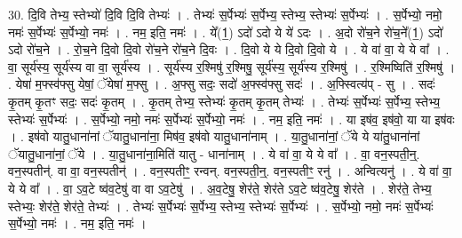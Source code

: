 \documentclass[17pt]{extarticle}
\begin{document}
30. दि॒वि तेभ्य॒ स्तेभ्यो॑ दि॒वि दि॒वि तेभ्यः॑ । . तेभ्यः॑ स॒र्पेभ्यः॑ स॒र्पेभ्य॒ स्तेभ्य॒ स्तेभ्यः॑ स॒र्पेभ्यः॑ । . स॒र्पेभ्यो॒ नमो॒ नमः॑ स॒र्पेभ्यः॑ स॒र्पेभ्यो॒ नमः॑ । . नम॒ इति॒ नमः॑ । . ये᳚(1॒) ऽदो॑ ऽदो ये ये॑ ऽदः । . अ॒दो रो॑च॒ने रो॑च॒ने᳚(1॒) ऽदो॑ ऽदो रो॑च॒ने । . रो॒च॒ने दि॒वो दि॒वो रो॑च॒ने रो॑च॒ने दि॒वः । . दि॒वो ये ये दि॒वो दि॒वो ये । . ये वा॑ वा॒ ये ये वा᳚ । . वा॒ सूर्य॑स्य॒ सूर्य॑स्य वा वा॒ सूर्य॑स्य । . सूर्य॑स्य र॒श्मिषु॑ र॒श्मिषु॒ सूर्य॑स्य॒ सूर्य॑स्य र॒श्मिषु॑ । . र॒श्मिष्विति॑ र॒श्मिषु॑ । . येषा॑ म॒फ्स्व॑फ्सु येषां॒ ॅयेषा॑ म॒फ्सु । . अ॒फ्सु सदः॒ सदो॑ अ॒फ्स्व॑फ्सु सदः॑ । . अ॒फ्स्वित्य॑प् - सु । . सदः॑ कृ॒तम् कृ॒तꣳ सदः॒ सदः॑ कृ॒तम् । . कृ॒तम् तेभ्य॒ स्तेभ्यः॑ कृ॒तम् कृ॒तम् तेभ्यः॑ । . तेभ्यः॑ स॒र्पेभ्यः॑ स॒र्पेभ्य॒ स्तेभ्य॒ स्तेभ्यः॑ स॒र्पेभ्यः॑ । . स॒र्पेभ्यो॒ नमो॒ नमः॑ स॒र्पेभ्यः॑ स॒र्पेभ्यो॒ नमः॑ । . नम॒ इति॒ नमः॑ । . या इष॑व॒ इष॑वो॒ या या इष॑वः । . इष॑वो यातु॒धाना॑नां ॅयातु॒धाना॑ना॒ मिष॑व॒ इष॑वो यातु॒धाना॑नाम् । . या॒तु॒धाना॑नां॒ ॅये ये या॑तु॒धाना॑नां ॅयातु॒धाना॑नां॒ ॅये । . या॒तु॒धाना॑ना॒मिति॑ यातु - धाना॑नाम् । . ये वा॑ वा॒ ये ये वा᳚ । . वा॒ वन॒स्पती॒न्॒. वन॒स्पतीन्॑. वा वा॒ वन॒स्पतीन्॑ । . वन॒स्पतीꣳ॒॒ रन्वन्. वन॒स्पती॒न्॒. वन॒स्पतीꣳ॒॒ रनु॑ । . अन्वित्यनु॑ । . ये वा॑ वा॒ ये ये वा᳚ । . वा॒ ऽव॒टे ष्व॑व॒टेषु॑ वा वा ऽव॒टेषु॑ । . अ॒व॒टेषु॒ शेर॑ते॒ शेर॑ते ऽव॒टे ष्व॑व॒टेषु॒ शेर॑ते । . शेर॑ते॒ तेभ्य॒ स्तेभ्यः॒ शेर॑ते॒ शेर॑ते॒ तेभ्यः॑ । . तेभ्यः॑ स॒र्पेभ्यः॑ स॒र्पेभ्य॒ स्तेभ्य॒ स्तेभ्यः॑ स॒र्पेभ्यः॑ । . स॒र्पेभ्यो॒ नमो॒ नमः॑ स॒र्पेभ्यः॑ स॒र्पेभ्यो॒ नमः॑ । . नम॒ इति॒ नमः॑ । \newline
\end{document}
